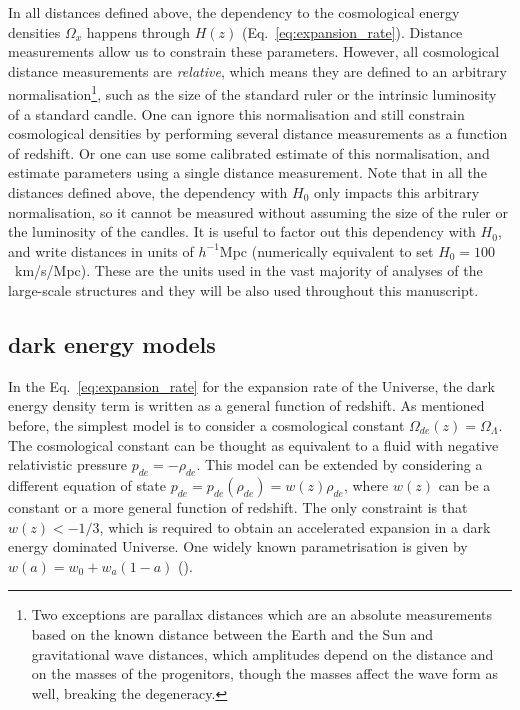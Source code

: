     In all distances defined above, the dependency to the cosmological energy densities
    $\Omega_x$ happens through $H(z)$ (Eq.~\ref{eq:expansion_rate}). 
    Distance measurements allow us to constrain these parameters. 
    However, all cosmological distance measurements are \emph{relative}, 
    which means they are defined to an arbitrary 
    normalisation\footnote{Two exceptions are parallax distances which are an absolute measurements
    based on the known distance between the Earth and the Sun and gravitational wave distances,
    which amplitudes depend on the distance and on the masses of the progenitors, though
    the masses affect the wave form as well, breaking the degeneracy.}, 
    such as the size of the standard ruler or the intrinsic luminosity of a standard candle.  
    One can ignore this normalisation and still constrain cosmological densities by 
    performing several distance measurements as a function of redshift.
    Or one can use some calibrated estimate of this normalisation, and estimate parameters 
    using a single distance measurement. 
    Note that in all the distances defined above, the dependency with $H_0$ only impacts
    this arbitrary normalisation, so it cannot be measured without assuming 
    the size of the ruler or the luminosity of the candles. 
    It is useful to factor out this dependency with $H_0$, and write distances 
    in units of $h^{-1}$Mpc (numerically equivalent to set $H_0 = 100$~km/s/Mpc). 
    These are the units used in the vast majority of analyses of the large-scale structures 
    and they will be also used throughout this manuscript. 
    
    \subsection{dark energy models}
    \label{intro:model:dark_energy_models}

    In the Eq.~\ref{eq:expansion_rate} for the expansion rate of the Universe, 
    the dark energy density term is written as a general function of redshift.
    As mentioned before, the simplest model is to consider a cosmological constant
    $\Omega_{de}(z) = \Omega_\Lambda$.  
    The cosmological constant can be thought as equivalent to a fluid with 
    negative relativistic pressure $p_{de} = -\rho_{de}$. 
    This model can be extended by considering a different equation of state 
    $p_{de} = p_{de}(\rho_{de}) = w(z) \rho_{de}$, 
    where $w(z)$ can be a constant or a more general function of redshift.
    The only constraint is that $w(z) < -1/3$, which is required to obtain 
    an accelerated expansion in a dark energy dominated Universe. 
    One widely known parametrisation is given by $w(a) = w_0 + w_a(1-a)$ 
    (\cite{chevallierAcceleratingUniversesScaling2001, linderExploringExpansionHistory2003}). 
    
